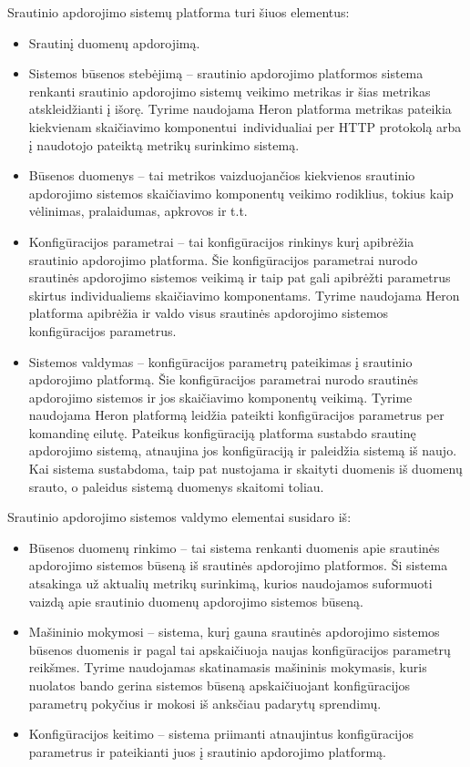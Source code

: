 \documentclass{VUMIFPSbakalaurinis}
\begin{document}
Srautinio apdorojimo sistemų platforma turi šiuos elementus:
\begin{itemize}
    \item Srautinį duomenų apdorojimą.
    \item Sistemos būsenos stebėjimą – srautinio apdorojimo platformos sistema renkanti srautinio apdorojimo sistemų veikimo metrikas ir šias metrikas atskleidžianti į išorę. Tyrime naudojama Heron platforma metrikas pateikia kiekvienam skaičiavimo komponentui individualiai per HTTP protokolą arba į naudotojo pateiktą metrikų surinkimo sistemą.
    \item Būsenos duomenys – tai metrikos vaizduojančios kiekvienos srautinio apdorojimo sistemos skaičiavimo komponentų  veikimo rodiklius, tokius kaip vėlinimas, pralaidumas, apkrovos ir t.t.
    \item Konfigūracijos parametrai – tai konfigūracijos rinkinys kurį apibrėžia srautinio apdorojimo platforma. Šie konfigūracijos parametrai nurodo srautinės apdorojimo sistemos veikimą ir taip pat gali apibrėžti parametrus skirtus individualiems skaičiavimo komponentams. Tyrime naudojama Heron platforma apibrėžia ir valdo visus srautinės apdorojimo sistemos konfigūracijos parametrus.
    \item Sistemos valdymas – konfigūracijos parametrų pateikimas į srautinio apdorojimo platformą. Šie konfigūracijos parametrai nurodo srautinės apdorojimo sistemos ir jos skaičiavimo komponentų veikimą. Tyrime naudojama Heron platformą leidžia pateikti konfigūracijos parametrus per komandinę eilutę. Pateikus konfigūraciją platforma sustabdo srautinę apdorojimo sistemą, atnaujina jos konfigūraciją ir paleidžia sistemą iš naujo. Kai sistema sustabdoma, taip pat nustojama ir skaityti duomenis iš duomenų srauto, o paleidus sistemą duomenys skaitomi toliau.
\end{itemize}
Srautinio apdorojimo sistemos valdymo elementai susidaro iš:
\begin{itemize}
    \item Būsenos duomenų rinkimo – tai sistema renkanti duomenis apie srautinės apdorojimo sistemos būseną iš srautinės apdorojimo platformos. Ši sistema atsakinga už aktualių metrikų surinkimą, kurios naudojamos suformuoti vaizdą apie srautinio duomenų apdorojimo sistemos būseną.
    \item Mašininio mokymosi – sistema, kurį gauna srautinės apdorojimo sistemos būsenos duomenis ir pagal tai apskaičiuoja naujas konfigūracijos parametrų reikšmes. Tyrime naudojamas skatinamasis mašininis mokymasis, kuris nuolatos bando gerina sistemos būseną apskaičiuojant konfigūracijos parametrų pokyčius ir mokosi iš anksčiau padarytų sprendimų.
    \item Konfigūracijos keitimo – sistema priimanti atnaujintus konfigūracijos parametrus ir pateikianti juos į srautinio apdorojimo platformą. 
\end{itemize}
\end{document}
